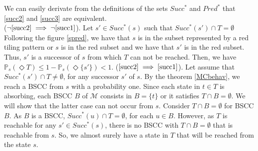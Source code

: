 \begin{proof2}\cite{PMC}
We can easily derivate from the definitions of the sets $Succ^*$ and $Pred^*$ that \ref{succ2} and \ref{succ3} are equivalent. \\
($\neg\ref{succ2}\implies\neg\ref{succ1}$). Let $s' \in Succ^*(s)$ such that $Succ^*(s') \cap T = \emptyset$ Following the figure \ref{spred}, we have that $s$ is in the subset represented by a red tiling pattern or $s$ is in the red subset and we have that $s'$ is in the red subset. Thus, $s'$ is a successor of $s$ from which $T$ can not be reached. Then, we have $\mathbb{P}_s(\Diamond T) \leq 1 - \mathbb{P}_s(\Diamond \{s'\}) < 1$.
($\ref{succ2} \implies \ref{succ1}$). Let assume that $Succ^*(s') \cap T \neq \emptyset$, for any successor $s'$ of $s$. By the theorem \ref{MCbehav}, we reach a BSCC from $s$ with a probability one. Since each state in $t \in T$ is absorbing, each BSCC $B$ of $\mathcal{M}$ consists in $B = \{t\}$ or it satisfies $T \cap B = \emptyset$. We will show that the latter case can not occur from $s$.
Consider $T \cap B = \emptyset$ for BSCC $B$.
As $B$ is a BSCC, $Succ^*(u)\cap T = \emptyset$, for each $u \in B$.
However, as $T$ is reachable for any $s' \in Succ^*(s)$, there is no BSCC with $T \cap B = \emptyset$ that is reachable from $s$. So, we almost surely have a state in $T$ that will be reached from the state $s$.
\end{proof2}
\\

